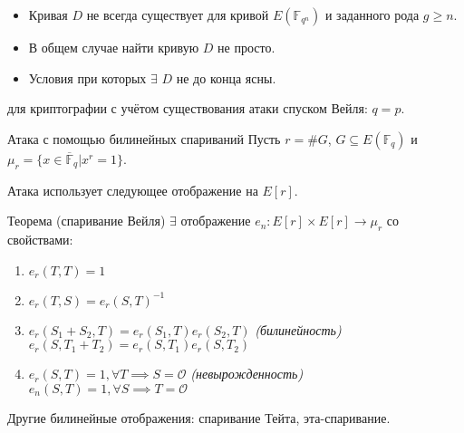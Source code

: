 \documentclass{beamer}
\begin{document}
\begin{frame}
\begin{itemize}
    \item Кривая $D$ не всегда существует для кривой $E(\mathbb{F}_{q^n})$ и заданного рода $g \geq n$.
    \item В общем случае найти кривую $D$ не просто.
    \item Условия при которых $\exists$ $D$ не до конца ясны.
\end{itemize}
 для криптографии с учётом существования атаки спуском Вейля: $q = p$.
\end{frame}

\begin{frame}{Атака с помощью билинейных спариваний}
Пусть $r = \#G$, $G \subseteq E(\mathbb{F}_q)$ и $\mu_r = \{x \in \overline{\mathbb{F}}_q | x^r = 1\}$.

Атака использует следующее отображение на $E[r]$.
    \begin{block}{Теорема (спаривание Вейля)}
    $\exists$ отображение
    $
    e_n: E[r] \times E[r] \rightarrow \mu_r
    $
    со свойствами:
    \begin{enumerate}
        \item $e_r(T,T) = 1$
        \item $e_r(T,S) = e_r(S,T)^{-1}$
        \item $e_r(S_1 + S_2, T) = e_r(S_1, T) e_r(S_2, T)$ \hfill \textit{(билинейность)} \\
        $e_r(S, T_1 + T_2) = e_r(S, T_1) e_r(S, T_2)$
        \item $e_r(S,T) = 1, \forall T \implies S = \mathcal{O}$ \hfill \textit{(невырожденность)}\\
        $e_n(S,T) = 1, \forall S \implies T = \mathcal{O}$
    \end{enumerate}
\end{block}

Другие билинейные отображения: спаривание Тейта, эта-спаривание.
\end{frame}
\end{document}

